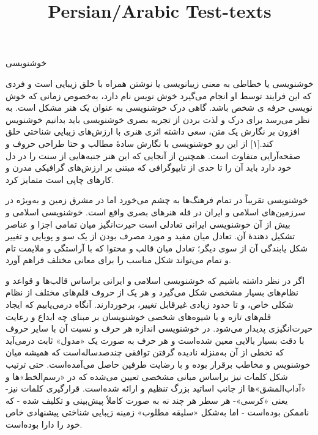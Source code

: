 \documentclass[a4paper]{article}
\title{Persian/Arabic Test-texts}
\begin{document}
\begin{flushright}
\pagecolor{pagecolor}
\color{textcolor}

\maketitle
\tableofcontents
\newpage


خوشنویسی


خوشنویسی یا خطاطی به معنی زیبانویسی یا نوشتن همراه با خلق زیبایی است و فردی که این فرایند توسط او انجام می‌گیرد خوش نویس نام دارد، به‌خصوص زمانی که خوش نویسی حرفه ی شخص باشد. گاهی درک خوشنویسی به عنوان یک هنر مشکل است. به نظر می‌رسد برای درک و لذت بردن از تجربه بصری خوشنویسی باید بدانیم خوشنویس افزون بر نگارش یک متن، سعی داشته اثری هنری با ارزش‌های زیبایی شناختی خلق کند.[۱] از این رو خوشنویسی با نگارش سادهٔ مطالب و حتا طراحی حروف و صفحه‌آرایی متفاوت است. همچنین از آنجایی که این هنر جنبه‌هایی از سنت را در دل خود دارد باید آن را تا حدی از تایپوگرافی که مبتنی بر ارزش‌های گرافیکی مدرن و کارهای چاپی است متمایز کرد.

خوشنویسی تقریباً در تمام فرهنگ‌ها به چشم می‌خورد اما در مشرق زمین و به‌ویژه در سرزمین‌های اسلامی و ایران در قله هنرهای بصری واقع است. خوشنویسی اسلامی و بیش از آن خوشنویسی ایرانی تعادلی است حیرت‌انگیز میان تمامی اجزا و عناصر تشکیل دهندهٔ آن. تعادل میان مفید و مورد مصرف بودن از یک سو و پویایی و تغییر شکل یابندگی آن از سوی دیگر؛ تعادل میان قالب و محتوا که با آراستگی و ملایمت تام و تمام می‌تواند شکل مناسب را برای معانی مختلف فراهم آورد.

اگر در نظر داشته باشیم که خوشنویسی اسلامی و ایرانی براساس قالب‌ها و قواعد و نظام‌های بسیار مشخصی شکل می‌گیرد و هر یک از حروف قلم‌های مختلف از نظام شکلی خاص، و تا حدود زیادی غیرقابل تغییر، برخوردارند. آنگاه درمی‌یابیم که ایجاد قلم‌های تازه و یا شیوه‌های شخصی خوشنویسان بر مبنای چه ابداع و رعایت حیرت‌انگیزی پدیدار می‌شود. در خوشنویسی اندازه هر حرف و نسبت آن با سایر حروف با دقت بسیار بالایی معین شده‌است و هر حرف به صورت یک «مدول» ثابت درمی‌آید که تخطی از آن به‌منزله نادیده گرفتن توافقی چندصدساله‌است که همیشه میان خوشنویس و مخاطب برقرار بوده و با رضایت طرفین حاصل می‌آمده‌است. حتی ترتیب شکل کلمات نیز براساس مبانی مشخصی تعیین می‌شده که در «رسم‌الخط»ها و «آداب‌المشق»ها از جانب اساتید بزرگ تنظیم و ارائه شده‌است. قرارگیری کلمات نیز- یعنی «کرسی»- هر سطر هر چند نه به صورت کاملاً پیش‌بینی و تکلیف شده - که ناممکن بوده‌است - اما به‌شکل «سلیقه مطلوب» زمینه زیبایی شناختی پیشنهادی خاص خود را دارا بوده‌است.




\end{flushright}
\end{document}
